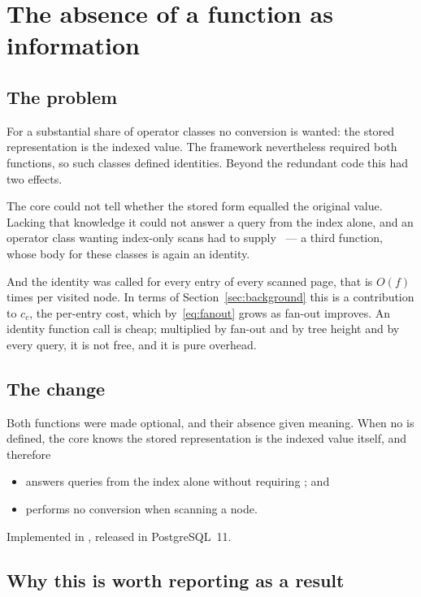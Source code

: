 \section{The absence of a function as information}
\label{sec:optional}

\subsection{The problem}

For a substantial share of operator classes no conversion is wanted: the stored
representation is the indexed value. The framework nevertheless required both
functions, so such classes defined identities. Beyond the redundant code this had
two effects.

The core could not tell whether the stored form equalled the original value.
Lacking that knowledge it could not answer a query from the index alone, and an
operator class wanting index-only scans had to supply ~--- a third
function, whose body for these classes is again an identity.

And the identity  was called for every entry of every scanned
page, that is $O(f)$ times per visited node. In terms of
Section~\ref{sec:background} this is a contribution to $c_c$, the per-entry cost,
which by~\eqref{eq:fanout} grows as fan-out improves. An identity function call
is cheap; multiplied by fan-out and by tree height and by every query, it is not
free, and it is pure overhead.

\subsection{The change}

Both functions were made optional, and their absence given meaning. When no
 is defined, the core knows the stored representation is the
indexed value itself, and therefore

\begin{itemize}
\item answers queries from the index alone without requiring ; and
\item performs no conversion when scanning a node.
\end{itemize}

Implemented in , released in PostgreSQL~11.

\subsection{Why this is worth reporting as a result}

